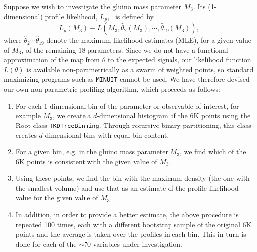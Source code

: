 Suppose we wish to investigate the gluino mass parameter $M_3$. Its 
(1-dimensional) profile likelihood, $L_p$,~\cite{James} is defined by
\begin{equation}
 L_p(M_3) \equiv L(M_3, \hat{\theta}_2(M_3),\cdots, \hat{\theta}_{19}(M_3)),
\end{equation}
where $\hat{\theta}_2\cdots\hat{\theta}_{19}$ denote the maximum likelihood 
estimates (MLE), for a given value of $M_3$, of the remaining 18 parameters. 
Since we do not have a functional approximation of the map from $\theta$ to the
expected signals, our likelihood
function $L(\theta)$ is available non-parametrically as a swarm of weighted points, so standard
maximizing programs such as {\tt MINUIT} cannot be used. We have therefore devised
our own non-parametric profiling algorithm, which proceeds as follows:
\begin{enumerate}
\item For each 1-dimensional bin of the parameter or observable of interest,
for example $M_3$, we create a $d$-dimensional histogram of the 6K points using the Root class {\tt TKDTreeBinning}. Through recursive binary partitioning, this class creates $d$-dimensional bins with equal bin content.
\item For a given bin, e.g. in the gluino mass parameter $M_3$, we find which of the 6K points is consistent with the given value of $M_3$.
\item Using these points, we find the bin with the maximum density (the one with the smallest
volume) and use that as an estimate of the profile likelihood value for the given value of $M_3$. 
\item In addition, in order to provide a better estimate, the above procedure is repeated 100 times, each with a different bootstrap sample of the original 6K points and the average is taken over the profiles in each bin. This in turn is done for each of the $\sim 70$ variables under investigation.
\end{enumerate}


